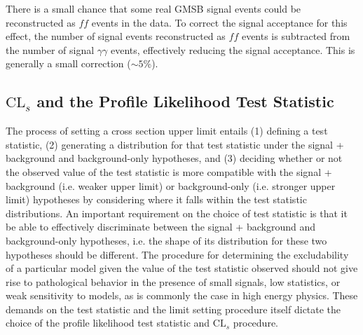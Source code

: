 \documentclass[dissertation.tex]{subfiles}
\begin{document}

There is a small chance that some real GMSB signal events could be reconstructed as $\mathit{ff}$ events in the data.  To correct the signal acceptance for this effect, the number of signal events reconstructed as $\mathit{ff}$ events is subtracted from the number of signal $\gamma\gamma$ events, effectively reducing the signal acceptance.  This is generally a small correction ($\sim5$\%).

\subsection{$\mbox{CL}_{s}$ and the Profile Likelihood Test Statistic}
\label{sec:CLs and the Profile Likelihood Test Statistic}

The process of setting a cross section upper limit entails (1) defining a test statistic, (2) generating a distribution for that test statistic under the signal + background and background-only hypotheses, and (3) deciding whether or not the observed value of the test statistic is more compatible with the signal + background (i.e. weaker upper limit) or background-only (i.e. stronger upper limit) hypotheses by considering where it falls within the test statistic distributions.  An important requirement on the choice of test statistic is that it be able to effectively discriminate between the signal + background and background-only hypotheses, i.e. the shape of its distribution for these two hypotheses should be different.  The procedure for determining the excludability of a particular model given the value of the test statistic observed should not give rise to pathological behavior in the presence of small signals, low statistics, or weak sensitivity to models, as is commonly the case in high energy physics.  These demands on the test statistic and the limit setting procedure itself dictate the choice of the profile likelihood test statistic and $\mbox{CL}_{s}$ procedure.
\end{document}
